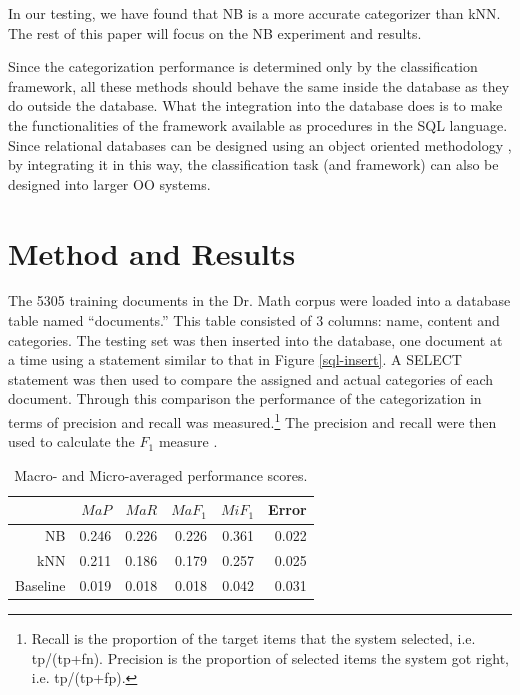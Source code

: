 \documentclass{ios}
\begin{document}
In our testing, we have found that NB is a more accurate categorizer
than kNN.  The rest of this paper will focus on the NB experiment and results.

Since the categorization performance is determined only by the classification 
framework, all these methods should behave the same inside the
database as they do outside 
the database. What the integration into the database does is to make the 
functionalities of the framework available as procedures in the SQL language.
Since relational databases can be designed using an object oriented methodology \cite{blaha:88,
rumbaugh:91}, by integrating it in this way, the classification task 
(and framework) can also be designed into larger OO systems.

\section{Method and Results}
\label{results}

 
The 5305 training documents in the Dr. Math corpus were loaded into a database 
table named ``documents.'' This table consisted of 3 columns: name, content and 
categories. The testing set was then inserted into the database, one document at a time 
using a statement similar to that in Figure \ref{sql-insert}. A SELECT
statement was then used to compare the assigned and actual categories
of each document. Through this comparison the performance of the
categorization in terms of precision and recall was
measured.\footnote{Recall is the proportion of the target items that
the system selected, i.e. tp/(tp+fn).  Precision is the proportion of
selected items the system got right, i.e. tp/(tp+fp).} The precision
and recall were then used
to calculate the $F_1$ measure \cite{calvo:01,sebastiani:02}.

\begin{table}
\begin{center}
\begin{tabular}{|r|r|r|r|r|r|}
\hline
         & $MaP$   & $MaR$   & $MaF_1$ & $MiF_1$ & Error \\ \hline
NB       & 0.246   & 0.226   & 0.226   & 0.361   & 0.022 \\ \hline
kNN      & 0.211   & 0.186   & 0.179   & 0.257   & 0.025 \\ \hline
Baseline & 0.019   & 0.018   & 0.018   & 0.042   & 0.031 \\ \hline
\end{tabular}
\end{center}
\caption{Macro- and Micro-averaged performance scores.}
\label{results-main}
\end{table}
\end{document}
